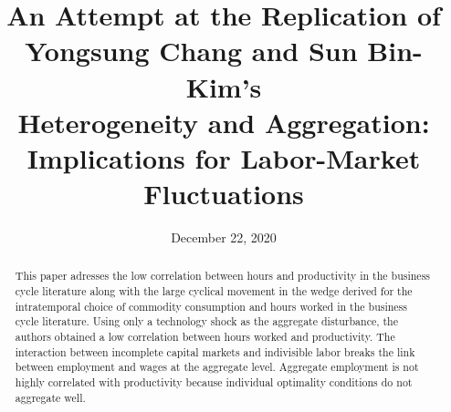 \documentclass[titlepage,letterpaper]{\econtex}
\providecommand{\texname}{FlawedPaper}
\providecommand{\versn}{}
\begin{document}



\title{An Attempt at the Replication of \\ Yongsung Chang and Sun Bin-Kim's \\ Heterogeneity and Aggregation: \\ Implications for Labor-Market Fluctuations}

\newlength\TableWidth


\date{December 22, 2020}
\maketitle




\hypertarget{Abstract}{}
\begin{abstract}
This paper adresses the low correlation between hours and productivity in the business cycle literature along with the large cyclical movement in the wedge derived for the intratemporal choice of commodity consumption and hours worked in the business cycle literature. Using only a technology shock as the aggregate disturbance, the authors obtained a low correlation between hours worked and productivity. The interaction between incomplete capital markets and indivisible labor breaks the link between employment and wages at the aggregate level. Aggregate employment is not highly correlated with productivity because individual optimality conditions do not aggregate well.
\end{abstract}
\end{document}
